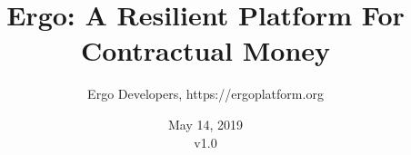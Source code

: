 \documentclass[]{article}
\begin{document}
    \title{Ergo: A Resilient Platform For Contractual Money}
    \author{Ergo Developers, https://ergoplatform.org}
    \date{May 14, 2019\\v1.0}

    \maketitle

    

    

    

    

    

    

    

    

    
\end{document}
